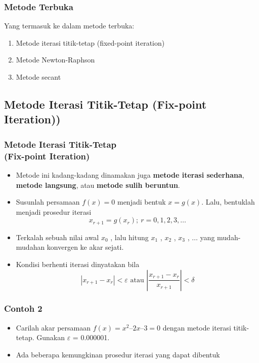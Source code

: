 \documentclass[pdflatex,compress]{beamer}
\begin{document}
\begin{frame}
	\frametitle{Metode Terbuka}
	Yang termasuk ke dalam metode terbuka:
	\begin{enumerate}
		\item Metode iterasi titik-tetap (fixed-point iteration)
		\item Metode Newton-Raphson
		\item Metode secant
	\end{enumerate}
\end{frame}

\subsection{Metode Iterasi Titik-Tetap (Fix-point Iteration))}

\begin{frame}
	\frametitle{Metode Iterasi Titik-Tetap\\(Fix-point Iteration)}
	\begin{itemize}
		\item Metode ini kadang-kadang dinamakan juga \textbf{metode iterasi sederhana}, \textbf{metode langsung}, atau \textbf{metode sulih beruntun}.
		\item Susunlah persamaan $ f(x) = 0 $ menjadi bentuk $ x = g(x) $. Lalu, bentuklah menjadi prosedur iterasi
		\[ x_{r+1} = g(x_r);~r = 0,1,2,3,\dots \]
		\item Terkalah sebuah nilai awal $ x_0 $ , lalu hitung $ x_1 $ , $ x_2 $ , $ x_3 $ , $ \dots $ yang mudah-mudahan konvergen ke akar sejati.
		\item Kondisi berhenti iterasi dinyatakan bila
		\[ |x_{r+1} - x_r | < \varepsilon \text{ atau } \left| \frac{x_{r+1} - x_r}{x_{r+1}} \right| < \delta\]
	\end{itemize}
\end{frame}

\begin{frame}
	\frametitle{Contoh 2}
	\begin{itemize}
		\item Carilah akar persamaan $ f(x) = x^2 – 2x – 3 = 0 $ dengan metode iterasi titik-tetap. Gunakan $\varepsilon$ = 0.000001.
		\item Ada beberapa kemungkinan prosedur iterasi yang dapat dibentuk
	\end{itemize}
\end{frame}
\end{document}
